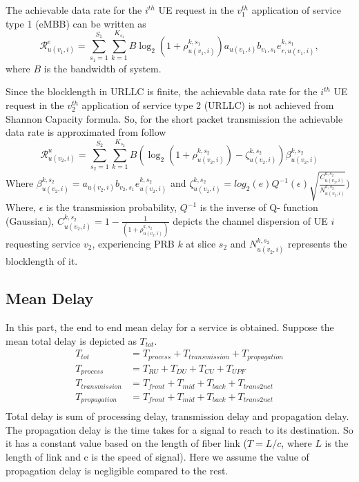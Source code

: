\documentclass[conference]{IEEEtran}
\begin{document}
The achievable data rate for the $i^{th}$ UE request in the $v_{1}^{th}$ application of service type 1 (eMBB) can be written as
\begin{equation}\label{eq1}
\mathcal{R}_{u(v_1,i)}^{e} = \sum_{s_1=1}^{S_1}\sum_{k=1}^{K_{s_1}} B \log_2({1+ \rho_{u(v_1,i)}^{k,s_1}})a_{u(v_1,i)} b_{v_1, s_1} e^{k,s_1}_{r,u(v_1,i)},
\end{equation}
where $B$ is the bandwidth of system. 

Since the blocklength in URLLC is finite, the achievable data rate for the $i^{th}$ UE request in the $v_{2}^{th}$ application of service type 2 (URLLC) is not achieved from Shannon Capacity formula. So, for the short packet transmission the achievable data rate is approximated from follow
\begin{equation}\label{eq1}
\mathcal{R}_{u(v_2,i)}^{u} = \sum_{s_2=1}^{S_2}\sum_{k=1}^{K_{s_2}} B (\log_2({1+ \rho_{u(v_2,i)}^{k,s_2}})- \zeta_{u(v_2,i)}^{k,s_2}){\beta}_{u(v_2,i)}^{k,s_2}
\end{equation}
Where ${\beta}_{u(v_2,i)}^{k,s_2}=a_{u(v_2,i)} b_{v_2, s_1} e^{k,s_2}_{u(v_2,i)}$
and $\zeta_{u(v_2,i)}^{k,s_2} = log_2({e})Q^{-1}(\epsilon) \sqrt{\frac{C_{u(v_2,i)}^{k,s_2}}{N_{u(v_2,i)}^{k,s_2}}})$
Where, $\epsilon $ is the transmission probability, $Q^{-1}$ is the inverse of Q- function (Gaussian),
$C_{u(v_2,i)}^{k,s_2} = 1 - \frac{1}{(1+\rho_{u(v_2,i)}^{k,s_2})}$ depicts the channel dispersion of UE  $i$ requesting service $v_2$, experiencing PRB $k$ at slice $s_2$  and
$N_{u(v_2,i)}^{k,s_2}$ represents the blocklength of it. 

\subsection{Mean Delay}
In this part, the end to end mean delay for a service is obtained.
Suppose the mean total delay is depicted as $T_{tot}$.
\begin{equation}
\begin{split}
T_{tot} &=  T_{process} + T_{transmission} + T_{propagation}\\
T_{process} &=  T_{RU} + T_{DU} + T_{CU} + T_{UPF}\\
T_{transmission} &= T_{front} + T_{mid} + T_{back} + T_{trans2net} \\
T_{propagation} &= T_{front} + T_{mid} + T_{back} + T_{trans2net} \\
\end{split}
\end{equation}
Total delay is sum of processing delay, transmission delay and propagation delay. 
The propagation delay is the time takes for a signal to reach to its destination. So it has a constant value based on the length of fiber link ($T = L/c$, where $L$ is the length of link and c is the speed of signal).
Here we assume the value of propagation delay is negligible compared to the rest.
\end{document}
